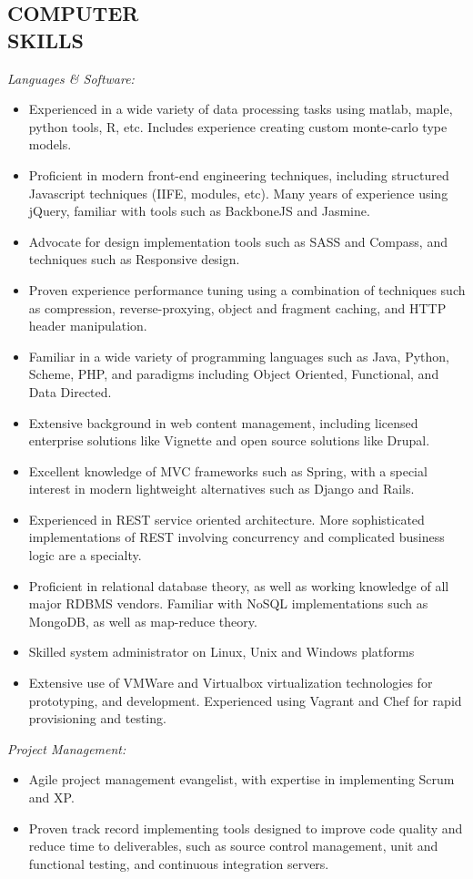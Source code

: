 \documentclass[line,margin]{res}
\begin{document}
\begin{resume}
\section{COMPUTER \\ SKILLS} {\sl Languages \& Software:} 
	\begin{itemize}
    \item Experienced in a wide variety of data processing tasks using matlab,
      maple, python tools, R, etc. Includes experience creating custom monte-carlo
      type models.
    \item Proficient in modern front-end engineering techniques, including
      structured Javascript techniques (IIFE, modules, etc). Many years of 
      experience using jQuery, familiar with tools such as BackboneJS and
      Jasmine.
    \item Advocate for design implementation tools such as SASS and
      Compass, and techniques such as Responsive design.
    \item Proven experience performance tuning using a combination of
      techniques such as compression, reverse-proxying, object and fragment caching, and
      HTTP header manipulation.
		\item Familiar in a wide variety of programming languages such as Java, Python, Scheme, PHP, and paradigms including Object Oriented, Functional, and Data Directed. 
    \item Extensive background in web content management, including licensed
      enterprise solutions like Vignette and open source
      solutions like Drupal.
    \item Excellent knowledge of MVC frameworks such as Spring, with a special
      interest in modern lightweight alternatives such as Django and Rails.
		\item Experienced in REST service oriented architecture. More sophisticated
      implementations of REST involving concurrency and complicated business
      logic are a specialty.
    \item Proficient in relational database theory, as well as working knowledge of all major
      RDBMS vendors. Familiar with NoSQL implementations such as MongoDB, as
      well as map-reduce theory.
		\item Skilled system administrator on Linux, Unix and Windows platforms        
		\item Extensive use of VMWare and Virtualbox virtualization technologies for prototyping,
    and development. Experienced using Vagrant and Chef for rapid provisioning
    and testing.
	\end{itemize}
      {\sl Project Management:}
	\begin{itemize}
		\item Agile project management evangelist, with expertise in
        implementing Scrum and XP.
		\item Proven track record implementing tools designed to improve code
        quality and reduce time to deliverables, such as source control
        management, unit and functional testing, and continuous integration
        servers.        
	\end{itemize}
                 

\end{resume}
\end{document}
